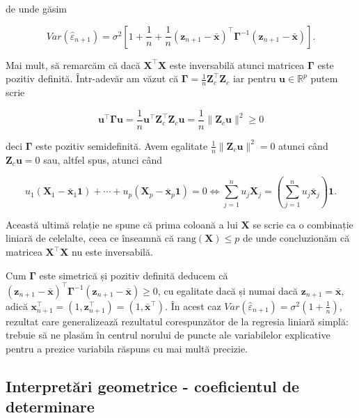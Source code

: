 \documentclass[]{article}
\begin{document}
de unde găsim

\[
  Var(\hat{\varepsilon}_{n+1}) = \sigma^2\left[1 + \frac{1}{n} + \frac{1}{n}(\boldsymbol z_{n+1} - \bar{\boldsymbol x})^\intercal \boldsymbol \Gamma^{-1}(\boldsymbol z_{n+1} - \bar{\boldsymbol x})\right].
\]

Mai mult, să remarcăm că dacă \(\boldsymbol X^\intercal \boldsymbol X\)
este inversabilă atunci matricea \(\boldsymbol \Gamma\) este pozitiv
definită. Într-adevăr am văzut că
\(\boldsymbol \Gamma = \frac{1}{n}\boldsymbol Z_c^\intercal\boldsymbol Z_c\)
iar pentru \(\boldsymbol u \in\mathbb{R}^p\) putem scrie

\[
  \boldsymbol u^\intercal \boldsymbol \Gamma\boldsymbol u = \frac{1}{n}\boldsymbol u^\intercal \boldsymbol Z_c^\intercal\boldsymbol Z_c \boldsymbol u = \frac{1}{n}\lVert\boldsymbol Z_c \boldsymbol u\rVert^2 \geq 0
\]

deci \(\boldsymbol \Gamma\) este pozitiv semidefinită. Avem egalitate
\(\frac{1}{n}\lVert\boldsymbol Z_c \boldsymbol u\rVert^2 = 0\) atunci
când \(\boldsymbol Z_c \boldsymbol u = 0\) sau, altfel spus, atunci când

\[
  u_1(\boldsymbol X_1 - \bar{\boldsymbol x}_1\mathbf{1}) + \cdots + u_p(\boldsymbol X_p - \bar{\boldsymbol x}_p\mathbf{1}) = 0 \iff \sum_{j=1}^{n}u_j\boldsymbol X_j = \left(\sum_{j=1}^{n}u_j\bar{\boldsymbol x}_j\right)\mathbf{1}.
\]

Această ultimă relație ne spune că prima coloană a lui \(\boldsymbol X\)
se scrie ca o combinație liniară de celelalte, ceea ce înseamnă că
\(\mathrm{rang}(\boldsymbol X)\leq p\) de unde concluzionăm că matricea
\(\boldsymbol X^\intercal \boldsymbol X\) nu este inversabilă.

Cum \(\boldsymbol \Gamma\) este simetrică și pozitiv definită deducem că
\((\boldsymbol z_{n+1} - \bar{\boldsymbol x})^\intercal \boldsymbol \Gamma^{-1}(\boldsymbol z_{n+1} - \bar{\boldsymbol x})\geq 0\),
cu egalitate dacă și numai dacă
\(\boldsymbol z_{n+1} = \bar{\boldsymbol x}\), adică
\(\boldsymbol x_{n+1}^\intercal = (1, \boldsymbol z_{n+1}^\intercal) = (1, \bar{\boldsymbol x}^\intercal)\).
În acest caz
\(Var(\hat{\varepsilon}_{n+1}) = \sigma^2\left(1+\frac{1}{n}\right)\),
rezultat care generalizează rezultatul corespunzător de la regresia
liniară simplă: trebuie să ne plasăm în centrul norului de puncte ale
variabilelor explicative pentru a prezice variabila răspuns cu mai multă
precizie.

\hypertarget{interpretari-geometrice---coeficientul-de-determinare}{%
\subsection{Interpretări geometrice - coeficientul de
determinare}\label{interpretari-geometrice---coeficientul-de-determinare}}
\end{document}

